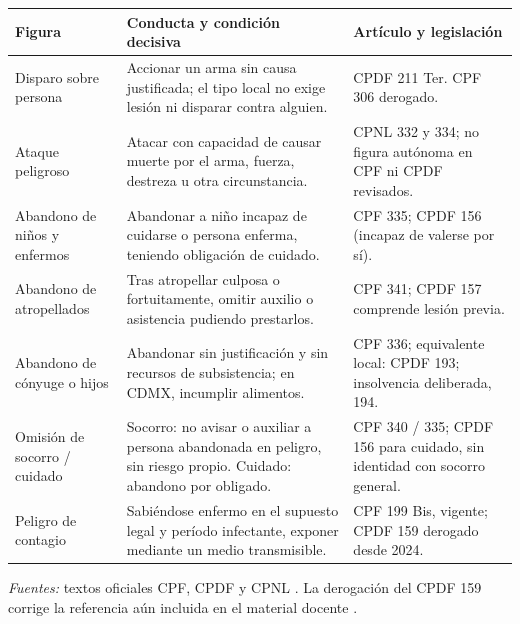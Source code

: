 \documentclass[spanish,letterpaper,oneside]{article}
\begin{document}
\begingroup\fontsize{9.5}{10.5}\selectfont
\begin{tabularx}{\linewidth}{@{}p{3.1cm}X p{4.15cm}@{}}
\toprule
\textbf{Figura} & \textbf{Conducta y condición decisiva} & \textbf{Artículo y legislación} \\
\midrule
Disparo sobre persona & Accionar un arma sin causa justificada; el tipo local no exige lesión ni disparar contra alguien. & CPDF 211 Ter. CPF 306 derogado. \\
Ataque peligroso & Atacar con capacidad de causar muerte por el arma, fuerza, destreza u otra circunstancia. & CPNL 332 y 334; no figura autónoma en CPF ni CPDF revisados. \\
Abandono de niños y enfermos & Abandonar a niño incapaz de cuidarse o persona enferma, teniendo obligación de cuidado. & CPF 335; CPDF 156 (incapaz de valerse por sí). \\
Abandono de atropellados & Tras atropellar culposa o fortuitamente, omitir auxilio o asistencia pudiendo prestarlos. & CPF 341; CPDF 157 comprende lesión previa. \\
Abandono de cónyuge o hijos & Abandonar sin justificación y sin recursos de subsistencia; en CDMX, incumplir alimentos. & CPF 336; equivalente local: CPDF 193; insolvencia deliberada, 194. \\
Omisión de socorro / cuidado & Socorro: no avisar o auxiliar a persona abandonada en peligro, sin riesgo propio. Cuidado: abandono por obligado. & CPF 340 / 335; CPDF 156 para cuidado, sin identidad con socorro general. \\
Peligro de contagio & Sabiéndose enfermo en el supuesto legal y período infectante, exponer mediante un medio transmisible. & CPF 199 Bis, vigente; CPDF 159 derogado desde 2024. \\
\bottomrule
\end{tabularx}
\par\vspace{2pt}\textit{Fuentes:} textos oficiales CPF, CPDF y CPNL \citep{cpfS4Vigente,cpdfS4Vigente,cpnlS4Vigente}. La derogación del CPDF 159 corrige la referencia aún incluida en el material docente \citep[p.~8]{unadmPenalS4Material}.
\endgroup
\end{document}
